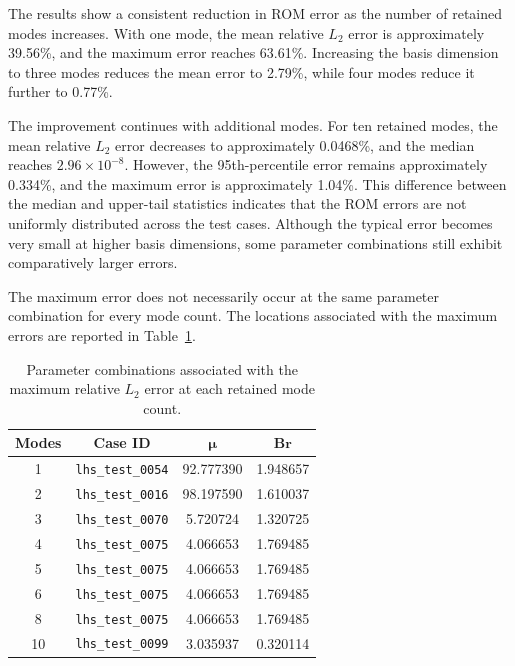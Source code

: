 The results show a consistent reduction in ROM error as
the number of retained modes increases. With one mode,
the mean relative $L_2$ error is approximately 39.56\%,
and the maximum error reaches 63.61\%. Increasing the
basis dimension to three modes reduces the mean error
to 2.79\%, while four modes reduce it further to 0.77\%.

The improvement continues with additional modes. For
ten retained modes, the mean relative $L_2$ error
decreases to approximately 0.0468\%, and the median
reaches $2.96\times10^{-8}$. However, the 95th-percentile
error remains approximately 0.334\%, and the maximum
error is approximately 1.04\%. This difference between
the median and upper-tail statistics indicates that
the ROM errors are not uniformly distributed across
the test cases. Although the typical error becomes very
small at higher basis dimensions, some parameter
combinations still exhibit comparatively larger errors.

The maximum error does not necessarily occur at the same
parameter combination for every mode count. The locations
associated with the maximum errors are reported in
Table~\ref{tab:mode_count_error_locations}.

\begin{table}[htbp]
    \centering
    \caption{Parameter combinations associated with the
    maximum relative $L_2$ error at each retained mode count.}
    \label{tab:mode_count_error_locations}
    \small
    \begin{tabular}{cccc}
        \toprule
        \textbf{Modes} &
        \textbf{Case ID} &
        $\boldsymbol{\mu}$ &
        $\boldsymbol{Br}$ \\
        \midrule
        1  & \texttt{lhs\_test\_0054} & 92.777390 & 1.948657 \\
        2  & \texttt{lhs\_test\_0016} & 98.197590 & 1.610037 \\
        3  & \texttt{lhs\_test\_0070} & 5.720724 & 1.320725 \\
        4  & \texttt{lhs\_test\_0075} & 4.066653 & 1.769485 \\
        5  & \texttt{lhs\_test\_0075} & 4.066653 & 1.769485 \\
        6  & \texttt{lhs\_test\_0075} & 4.066653 & 1.769485 \\
        8  & \texttt{lhs\_test\_0075} & 4.066653 & 1.769485 \\
        10 & \texttt{lhs\_test\_0099} & 3.035937 & 0.320114 \\
        \bottomrule
    \end{tabular}
\end{table}

